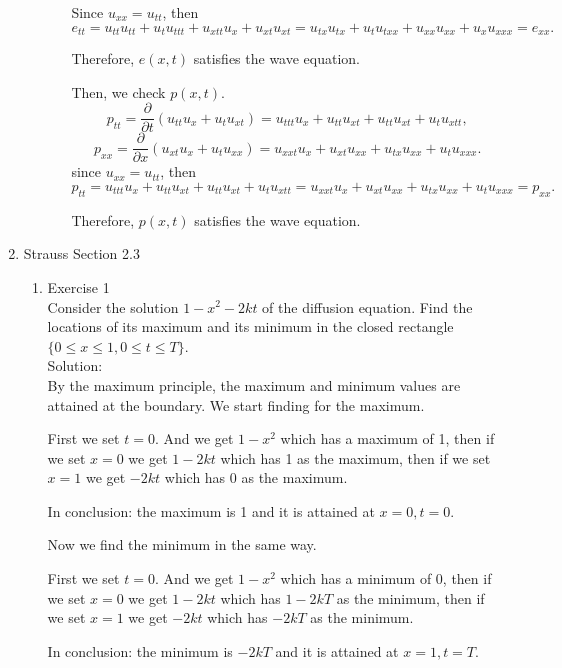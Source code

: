 \documentclass[12pt]{article}%
\begin{document}
\begin{enumerate}
\begin{enumerate}
\begin{enumerate}
            Since $u_{xx}=u_{tt}$, then 
            \[ e_{tt}=u_{tt} u_{tt}+u_{t} u_{ttt}+u_{xtt} u_{x}+u_{xt} u_{xt}=u_{tx} u_{tx}+u_{t} u_{txx}+u_{xx} u_{xx}+u_{x} u_{xxx}=e_{xx}. \]
            
            Therefore, $e(x,t)$ satisfies the wave equation.
            

            Then, we check $p(x,t).$
            \[p_{tt}  =\frac{\partial}{\partial t}\left(u_{tt} u_{x}+u_{t} u_{xt}\right)=u_{ttt} u_{x}+u_{tt} u_{xt}+u_{tt} u_{xt}+u_{t} u_{xtt},\]          
            \[ p_{xx}  =\frac{\partial}{\partial x}\left(u_{xt} u_{x}+u_{t} u_{xx}\right) =u_{xxt} u_{x}+u_{xt} u_{xx}+u_{tx} u_{xx}+u_{t} u_{xxx}. \]
            since $u_{xx}=u_{tt}$, then 
            \[ p_{tt}=u_{ttt} u_{x}+u_{tt} u_{xt}+u_{tt} u_{xt}+u_{t} u_{xtt}=u_{xxt} u_{x}+u_{xt} u_{xx}+u_{tx} u_{xx}+u_{t} u_{xxx}=p_{xx}. \]
            
            Therefore, $p(x,t)$ satisfies the wave equation.
        \end{enumerate}
    \end{enumerate}
    
    \pagebreak

    \item Strauss Section 2.3 \smallskip
    \begin{enumerate}
        \item Exercise 1 \smallskip \\
        Consider the solution $1 - x^2 -2kt$ of the diffusion equation.  Find the locations of its maximum and its minimum in the closed rectangle $\{0 \leq x \leq 1, 0 \leq t \leq T\}$. \smallskip \\
          Solution:\\
          By the maximum principle, the maximum and minimum values are attained
          at the boundary.
          We start finding for the maximum.

          First we set $t=0$. And we get $1-x^2$ which has a maximum of 1, then
          if we set $x=0$ we get $1-2kt$ which has 1 as the maximum, then
          if we set $x=1$ we get $-2kt$ which has 0 as the maximum.

          In conclusion: the maximum is 1 and it is attained at $x=0,t=0$.
          
          Now we find the minimum in the same way.

          First we set $t=0$. And we get $1-x^2$ which has a minimum of 0, then
          if we set $x=0$ we get $1-2kt$ which has $1-2kT$ as the minimum, then
          if we set $x=1$ we get $-2kt$ which has $-2kT$ as the minimum.

          In conclusion: the minimum is $-2kT$ and it is attained at $x=1,t=T$.
    \end{enumerate}
\end{enumerate}
\end{document}
